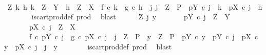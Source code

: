 \begin{isabellebody}
\ \ \ \ \isamarkupfalse%
\ {\isachardoublequoteopen}{\isasymAnd}Z\ k\ h{\isachardot}{\kern0pt}\ k\ {\isacharcolon}{\kern0pt}\ Z\ {\isasymrightarrow}\ Y\ {\isasymLongrightarrow}\ h\ {\isacharcolon}{\kern0pt}\ Z\ {\isasymrightarrow}\ X\ {\isasymLongrightarrow}\ f\ {\isasymcirc}\isactrlsub c\ k\ {\isacharequal}{\kern0pt}\ g\ {\isasymcirc}\isactrlsub c\ h\ {\isasymLongrightarrow}\ {\isasymexists}j{\isachardot}{\kern0pt}\ j\ {\isacharcolon}{\kern0pt}\ Z\ {\isasymrightarrow}\ P\ {\isasymand}\ pY\ {\isasymcirc}\isactrlsub c\ j\ {\isacharequal}{\kern0pt}\ k\ {\isasymand}\ pX\ {\isasymcirc}\isactrlsub c\ j\ {\isacharequal}{\kern0pt}\ h{\isachardoublequoteclose}\isanewline
\ \ \ \ \ \ \isamarkupfalse%
\ is{\isacharunderscore}{\kern0pt}cart{\isacharunderscore}{\kern0pt}prod{\isacharunderscore}{\kern0pt}def\ prod\ \isamarkupfalse%
\ blast\isanewline
\ \ \ \ \isamarkupfalse%
\ {\isachardoublequoteopen}{\isasymAnd}Z\ j\ y{\isachardot}{\kern0pt}\isanewline
\ \ \ \ \ \ \ pY\ {\isasymcirc}\isactrlsub c\ j\ {\isacharcolon}{\kern0pt}\ Z\ {\isasymrightarrow}\ Y\ {\isasymLongrightarrow}\isanewline
\ \ \ \ \ \ \ pX\ {\isasymcirc}\isactrlsub c\ j\ {\isacharcolon}{\kern0pt}\ Z\ {\isasymrightarrow}\ X\ {\isasymLongrightarrow}\isanewline
\ \ \ \ \ \ \ f\ {\isasymcirc}\isactrlsub c\ pY\ {\isasymcirc}\isactrlsub c\ j\ {\isacharequal}{\kern0pt}\ g\ {\isasymcirc}\isactrlsub c\ pX\ {\isasymcirc}\isactrlsub c\ j\ {\isasymLongrightarrow}\ j\ {\isacharcolon}{\kern0pt}\ Z\ {\isasymrightarrow}\ P\ {\isasymLongrightarrow}\ y\ {\isacharcolon}{\kern0pt}\ Z\ {\isasymrightarrow}\ P\ {\isasymLongrightarrow}\ pY\ {\isasymcirc}\isactrlsub c\ y\ {\isacharequal}{\kern0pt}\ pY\ {\isasymcirc}\isactrlsub c\ j\ {\isasymLongrightarrow}\ pX\ {\isasymcirc}\isactrlsub c\ y\ {\isacharequal}{\kern0pt}\ pX\ {\isasymcirc}\isactrlsub c\ j\ {\isasymLongrightarrow}\ j\ {\isacharequal}{\kern0pt}\ y{\isachardoublequoteclose}\isanewline
\ \ \ \ \ \ \isamarkupfalse%
\ is{\isacharunderscore}{\kern0pt}cart{\isacharunderscore}{\kern0pt}prod{\isacharunderscore}{\kern0pt}def\ prod\ \isamarkupfalse%
\ blast\isanewline
\ \ \isamarkupfalse%
\isanewline
{}\isamarkupfalse%
%
\endisatagproof
{\isafoldproof}%
%
\isadelimproof
\isanewline
%
\endisadelimproof
%
\isadelimtheory
\isanewline
%
\endisadelimtheory
%
\isatagtheory
{}\isamarkupfalse%
%
\endisatagtheory
{\isafoldtheory}%
%
\isadelimtheory
%
\endisadelimtheory
%
\end{isabellebody}%
\endinput
